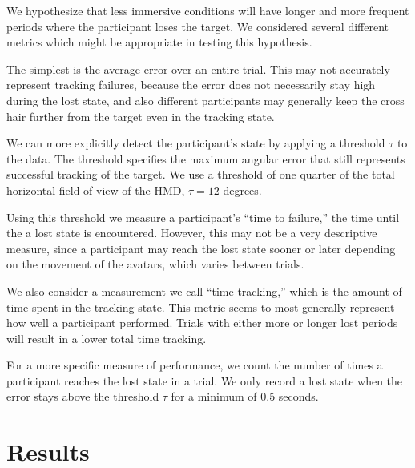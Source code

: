 \documentclass{acmsiggraph}                     %
\begin{document}

We hypothesize that less immersive conditions will have longer and more frequent periods where the participant loses the target.  We considered several different metrics which might be appropriate in testing this hypothesis.

The simplest is the average error over an entire trial.  This may not accurately represent tracking failures, because the error does not necessarily stay high during the lost state, and also different participants may generally keep the cross hair further from the target even in the tracking state.


We can more explicitly detect the participant's state by applying a threshold $\tau$ to the data.  The threshold specifies the maximum angular error that still represents successful tracking of the target. 
We use a threshold of one quarter of the total horizontal field of view of the HMD, $\tau = 12$ degrees.

Using this threshold we measure a participant's ``time to failure,'' the time until the a lost state is encountered.  However, this may not be a very descriptive measure, since a participant may reach the lost state sooner or later depending on the movement of the avatars, which varies between trials.

We also consider a measurement we call ``time tracking,'' which is the amount of time spent in the tracking state.  This metric seems to most generally represent how well a participant performed.  Trials with either more or longer lost periods will result in a lower total time tracking.

For a more specific measure of performance, we count the number of times a participant reaches the lost state in a trial.  We only record a lost state when the error stays above the threshold $\tau$ for a minimum of 0.5 seconds.



\section{Results}
\end{document}
